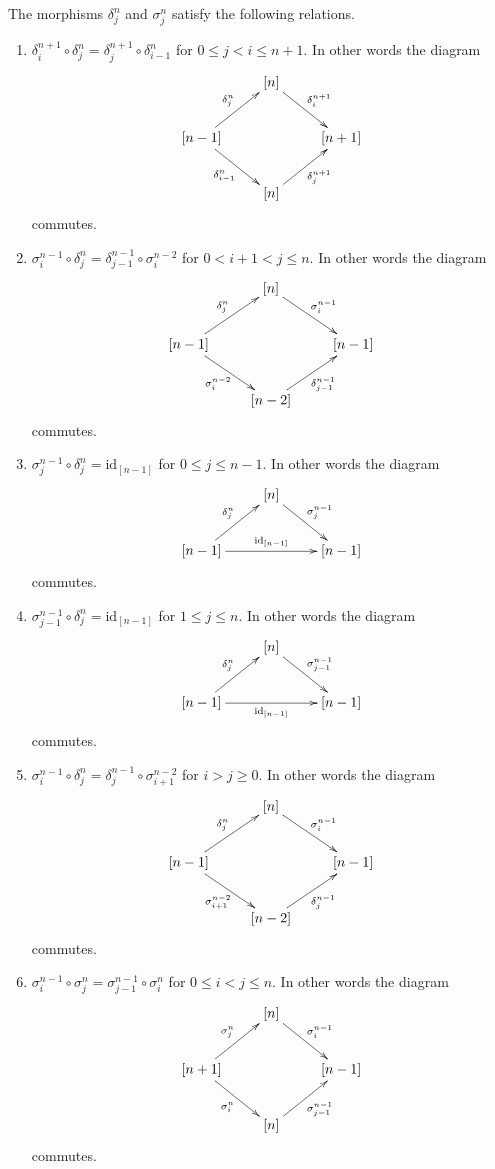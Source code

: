 \begin{lemma}
\label{lemma-relations-face-degeneracy}
The morphisms $\delta^n_j$ and $\sigma^n_j$ satisfy the following relations.
\begin{enumerate}
\item $\delta^{n + 1}_i \circ \delta^n_j =
\delta^{n + 1}_j \circ \delta^n_{i - 1}$
for $0 \leq j < i \leq n + 1$.
In other words the diagram
$$
\xymatrix{
& [n] \ar[rd]^{\delta^{n + 1}_i} & \\
[n - 1] \ar[ru]^{\delta^n_j} \ar[rd]_{\delta^n_{i - 1}} & &
[n + 1] \\
& [n] \ar[ru]_{\delta^{n + 1}_j} & 
}
$$
commutes.
\item $\sigma^{n - 1}_i \circ \delta^n_j =
\delta^{n - 1}_{j - 1} \circ \sigma^{n - 2}_i$
for $0 < i + 1 < j \leq n$.
In other words the diagram
$$
\xymatrix{
& [n] \ar[rd]^{\sigma^{n - 1}_i} & \\
[n - 1] \ar[ru]^{\delta^n_j} \ar[rd]_{\sigma^{n - 2}_i} & &
[n - 1] \\
& [n - 2] \ar[ru]_{\delta^{n - 1}_{j - 1}} & 
}
$$
commutes.
\item $\sigma^{n - 1}_j \circ \delta^n_j =
\text{id}_{[n - 1]}$
for $0 \leq j \leq n - 1$.
In other words the diagram
$$
\xymatrix{
& [n] \ar[rd]^{\sigma^{n - 1}_j} & \\
[n - 1] \ar[ru]^{\delta^n_j} \ar[rr]^{\text{id}_{[n - 1]}} & & [n - 1]
}
$$
commutes.
\item $\sigma^{n - 1}_{j - 1} \circ \delta^n_j =
\text{id}_{[n - 1]}$
for $1 \leq j \leq n$.
In other words the diagram
$$
\xymatrix{
& [n] \ar[rd]^{\sigma^{n - 1}_{j - 1}} & \\
[n - 1] \ar[ru]^{\delta^n_j} \ar[rr]_{\text{id}_{[n - 1]}} & & [n - 1]}
$$
commutes.
\item $\sigma^{n - 1}_i \circ \delta^n_j =
\delta^{n - 1}_j \circ \sigma^{n - 2}_{i + 1}$
for $i > j \geq 0$.
In other words the diagram
$$
\xymatrix{
& [n] \ar[rd]^{\sigma^{n - 1}_i} & \\
[n - 1] \ar[ru]^{\delta^n_j} \ar[rd]_{\sigma^{n - 2}_{i + 1}} & &
[n - 1] \\
& [n - 2] \ar[ru]_{\delta^{n - 1}_j} & 
}
$$
commutes.
\item $\sigma^{n - 1}_i \circ \sigma^n_j =
\sigma^{n - 1}_{j - 1} \circ \sigma^n_i$
for $0 \leq i < j \leq n$.
In other words the diagram
$$
\xymatrix{
& [n] \ar[rd]^{\sigma^{n - 1}_i} & \\
[n + 1] \ar[ru]^{\sigma^n_j} \ar[rd]_{\sigma^n_i} & &
[n - 1] \\
& [n] \ar[ru]_{\sigma^{n - 1}_{j - 1}} & 
}
$$
commutes.
\end{enumerate}
\end{lemma}

